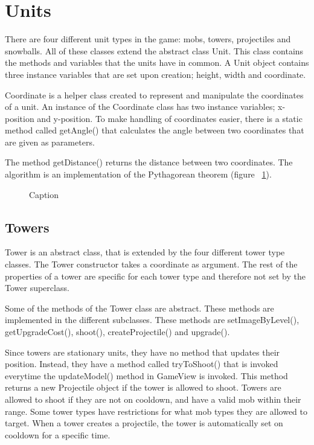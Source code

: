 \section{Units}

There are four different unit types in the game: mobs, towers, projectiles and snowballs. All of these classes extend the abstract class Unit. This class contains the methods and variables that the units have in common. A Unit object contains three instance variables that are set upon creation; height, width and coordinate.

Coordinate is a helper class created to represent and manipulate the coordinates of a unit. An instance of the Coordinate class has two instance variables; x-position and y-position. To make handling of coordinates easier, there is a static method called getAngle() that calculates the angle between two coordinates that are given as parameters.

The method getDistance() returns the distance between two coordinates. The algorithm is an implementation of the Pythagorean theorem (figure ~\ref{fig:codeExGetDistance}).

\begin{figure}[htb]
\begin{small}

\end{small}
\caption{Caption}
\label{fig:codeExGetDistance}
\end{figure}

\subsection{Towers}

Tower is an abstract class, that is extended by the four different tower type classes. The Tower constructor takes a coordinate as argument. The rest of the properties of a tower are specific for each tower type and therefore not set by the Tower superclass. 

Some of the methods of the Tower class are abstract. These methods are implemented in the different subclasses. These methods are setImageByLevel(), getUpgradeCost(), shoot(), createProjectile() and upgrade(). 

Since towers are stationary units, they have no method that updates their position. Instead, they have a method called tryToShoot() that is invoked everytime the updateModel() method in GameView is invoked. This method returns a new Projectile object if the tower is allowed to shoot. Towers are allowed to shoot if they are not on cooldown, and have a valid mob within their range. Some tower types have restrictions for what mob types they are allowed to target. When a tower creates a projectile, the tower is automatically set on cooldown for a specific time.

